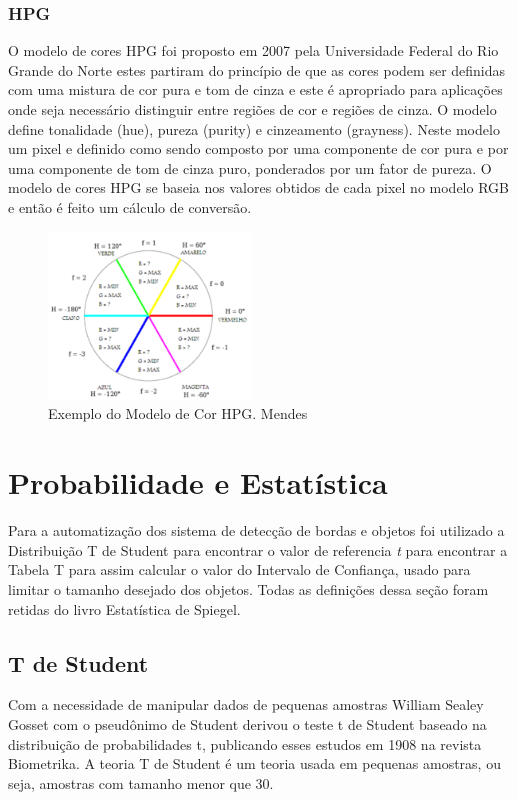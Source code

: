\subsubsection{HPG} 

O modelo de cores HPG foi proposto em 2007 pela Universidade Federal do Rio Grande do Norte estes partiram do princípio de que as cores podem ser definidas com uma mistura de cor pura e tom de cinza\cite{Martins:2007} e este é apropriado para aplicações onde seja necessário distinguir entre regiões de cor e regiões de cinza\cite{Mendes:2008}. O modelo define tonalidade (hue), pureza (purity) e cinzeamento (grayness). Neste modelo um pixel e definido como sendo composto por uma componente de cor pura e por uma componente de tom de cinza puro, ponderados por um fator de pureza\cite{Mendes:2008}.
O modelo de cores HPG se baseia nos valores obtidos de cada pixel no modelo RGB e então é feito um cálculo de conversão.
\begin{figure}[!h]
	\centering
	\includegraphics[width=0.48\textwidth]{hpg.pdf}
	\caption{Exemplo do Modelo de Cor HPG.  Mendes \cite{Mendes:2008}}
	\label{ModeloHPG}
\end{figure} 
\newpage

\section{Probabilidade e Estatística}

Para a automatização dos sistema de detecção de bordas e objetos foi utilizado a Distribuição T de Student para encontrar o valor de referencia \textit{t} para encontrar a Tabela T\cite{TabelaUFF} para assim calcular o valor do Intervalo de Confiança, usado para limitar o tamanho desejado dos objetos.
Todas as definições dessa seção foram retidas do livro Estatística de Spiegel\cite{Spiegel:1974}. 
\subsection{T de Student}
Com a necessidade de manipular dados de pequenas amostras William Sealey Gosset com o pseudônimo de Student derivou o teste t de Student baseado na distribuição de probabilidades t, publicando esses estudos em 1908 na revista Biometrika\cite{UFRN}.
A teoria T de Student é um teoria usada em pequenas amostras, ou seja, amostras com tamanho menor que 30.

